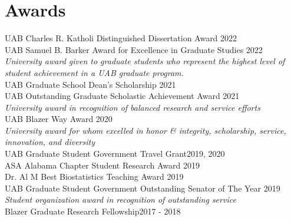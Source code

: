 \section{Awards} 
UAB Charles R. Katholi Distinguished Dissertation Award \hfill 2022\\

UAB Samuel B. Barker Award for Excellence in Graduate Studies \hfill 2022\\
\textit{University award given to graduate students who represent the highest level of student achievement in a UAB graduate program. }\\

UAB Graduate School Dean's Scholarship \hfill 2021\\

UAB Outstanding Graduate Scholastic Achievement Award \hfill 2021\\
\textit{University award in recognition of balanced research and service efforts}\\

UAB Blazer Way Award \hfill 2020\\
\textit{University award for whom excelled in honor \& integrity, scholarship, service, innovation, and diversity}\\

UAB Graduate Student Government Travel Grant\hfill 2019, 2020\\

ASA Alabama Chapter Student Research Award \hfill 2019\\

Dr. Al M Best Biostatistics Teaching Award \hfill 2019\\

UAB Graduate Student Government Outstanding Senator of The Year \hfill 2019\\
\textit{Student organization award in recognition of outstanding service}\\

Blazer Graduate Research Fellowship\hfill 2017 - 2018
